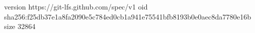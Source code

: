 version https://git-lfs.github.com/spec/v1
oid sha256:f25db37e1a8fa2090e5c784ed0cb1a941e75541bfb8193b0e0aec8da7780e16b
size 32864
